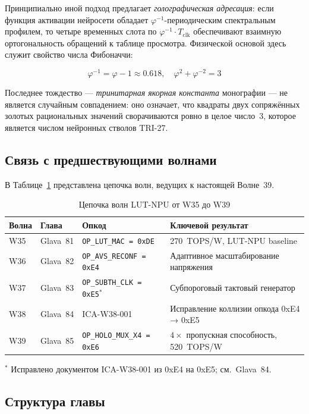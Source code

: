 Принципиально иной подход предлагает \emph{голографическая адресация}:
если функция активации нейросети обладает
$\varphi^{-1}$-периодическим спектральным профилем, то четыре временных
слота по $\varphi^{-1} \cdot T_{\mathrm{clk}}$ обеспечивают взаимную
ортогональность обращений к таблице просмотра.
Физической основой здесь служит свойство числа Фибоначчи:

\[
  \varphi^{-1} = \varphi - 1 \approx 0.618,
  \quad
  \varphi^{2} + \varphi^{-2} = 3
\]

Последнее тождество — \emph{тринитарная якорная константа} монографии —
не является случайным совпадением: оно означает, что квадраты двух
сопряжённых золотых рациональных значений сворачиваются ровно в
целое число~3, которое является числом нейронных стволов TRI-27.

\subsection{Связь с предшествующими волнами}
\label{subsec:glava85-prior-waves}

В Таблице~\ref{tab:wave-chain} представлена цепочка волн, ведущих
к настоящей Волне~39.

\begin{table}[ht]
\centering
\caption{Цепочка волн LUT-NPU от W35 до W39}
\label{tab:wave-chain}
\begin{tabular}{@{}llll@{}}
\toprule
Волна & Глава & Опкод & Ключевой результат \\
\midrule
W35 & Glava~81 & \texttt{OP\_LUT\_MAC = 0xDE} &
  270~TOPS/W, LUT-NPU baseline \\
W36 & Glava~82 & \texttt{OP\_AVS\_RECONF = 0xE4} &
  Адаптивное масштабирование напряжения \\
W37 & Glava~83 & \texttt{OP\_SUBTH\_CLK = 0xE5}$^*$ &
  Субпороговый тактовый генератор \\
W38 & Glava~84 & ICA-W38-001 &
  Исправление коллизии опкода 0xE4 → 0xE5 \\
W39 & Glava~85 & \texttt{OP\_HOLO\_MUX\_X4 = 0xE6} &
  $4\times$ пропускная способность, 520~TOPS/W \\
\bottomrule
\end{tabular}
\end{table}

$^*$ Исправлено документом ICA-W38-001 из 0xE4 на 0xE5; см.\ Glava~84.

\subsection{Структура главы}
\label{subsec:glava85-structure}

